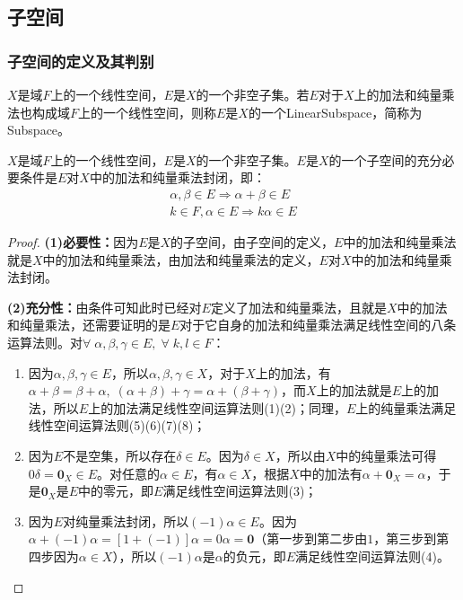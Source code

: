 \subsection{子空间}
\subsubsection{子空间的定义及其判别}
\begin{definition}
	$X$是域$F$上的一个线性空间，$E$是$X$的一个非空子集。若$E$对于$X$上的加法和纯量乘法也构成域$F$上的一个线性空间，则称$E$是$X$的一个\gls{LinearSubspace}，简称为\gls{Subspace}。
\end{definition}
\begin{theorem}\label{theo:Subspace}
	$X$是域$F$上的一个线性空间，$E$是$X$的一个非空子集。$E$是$X$的一个子空间的充分必要条件是$E$对$X$中的加法和纯量乘法封闭，即：
	\begin{gather*}
		\alpha,\beta\in E\Rightarrow\alpha+\beta\in E \\
		k\in F,\alpha\in E\Rightarrow k\alpha\in E
	\end{gather*}
\end{theorem}
\begin{proof}
	\textbf{(1)必要性：}因为$E$是$X$的子空间，由子空间的定义，$E$中的加法和纯量乘法就是$X$中的加法和纯量乘法，由加法和纯量乘法的定义，$E$对$X$中的加法和纯量乘法封闭。\par
	\textbf{(2)充分性：}由条件可知此时已经对$E$定义了加法和纯量乘法，且就是$X$中的加法和纯量乘法，还需要证明的是$E$对于它自身的加法和纯量乘法满足线性空间的八条运算法则。对$\forall\;\alpha,\beta,\gamma\in E,\;\forall\;k,l\in F$：
	\begin{enumerate}
		\item 因为$\alpha,\beta,\gamma\in E$，所以$\alpha,\beta,\gamma\in X$，对于$X$上的加法，有$\alpha+\beta=\beta+\alpha,\;(\alpha+\beta)+\gamma=\alpha+(\beta+\gamma)$，而$X$上的加法就是$E$上的加法，所以$E$上的加法满足线性空间运算法则(1)(2)；同理，$E$上的纯量乘法满足线性空间运算法则(5)(6)(7)(8)；
		\item 因为$E$不是空集，所以存在$\delta\in E$。因为$\delta\in X$，所以由$X$中的纯量乘法可得$0\delta=\mathbf{0}_X\in E$。对任意的$\alpha\in E$，有$\alpha\in X$，根据$X$中的加法有$\alpha+\mathbf{0}_X=\alpha$，于是$\mathbf{0}_X$是$E$中的零元，即$E$满足线性空间运算法则(3)；
		\item 因为$E$对纯量乘法封闭，所以$(-1)\alpha\in E$。因为$\alpha+(-1)\alpha=[1+(-1)]\alpha=0\alpha=\mathbf{0}$（第一步到第二步由$1$，第三步到第四步因为$\alpha\in X$），所以$(-1)\alpha$是$\alpha$的负元，即$E$满足线性空间运算法则(4)。
	\end{enumerate}
\end{proof}

